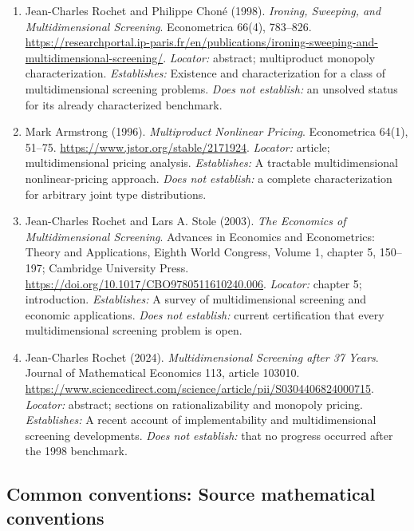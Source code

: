 \documentclass[11pt,a4paper]{article}
\begin{document}
\begin{enumerate}

\item[S1] Jean-Charles Rochet and Philippe Choné (1998). \emph{Ironing, Sweeping, and Multidimensional Screening}. Econometrica 66(4), 783--826. \url{https://researchportal.ip-paris.fr/en/publications/ironing-sweeping-and-multidimensional-screening/}. \textit{Locator:} abstract; multiproduct monopoly characterization. \textit{Establishes:} Existence and characterization for a class of multidimensional screening problems. \textit{Does not establish:} an unsolved status for its already characterized benchmark.

\item[S2] Mark Armstrong (1996). \emph{Multiproduct Nonlinear Pricing}. Econometrica 64(1), 51--75. \url{https://www.jstor.org/stable/2171924}. \textit{Locator:} article; multidimensional pricing analysis. \textit{Establishes:} A tractable multidimensional nonlinear-pricing approach. \textit{Does not establish:} a complete characterization for arbitrary joint type distributions.

\item[S3] Jean-Charles Rochet and Lars A. Stole (2003). \emph{The Economics of Multidimensional Screening}. Advances in Economics and Econometrics: Theory and Applications, Eighth World Congress, Volume 1, chapter 5, 150--197; Cambridge University Press. \url{https://doi.org/10.1017/CBO9780511610240.006}. \textit{Locator:} chapter 5; introduction. \textit{Establishes:} A survey of multidimensional screening and economic applications. \textit{Does not establish:} current certification that every multidimensional screening problem is open.

\item[S4] Jean-Charles Rochet (2024). \emph{Multidimensional Screening after 37 Years}. Journal of Mathematical Economics 113, article 103010. \url{https://www.sciencedirect.com/science/article/pii/S0304406824000715}. \textit{Locator:} abstract; sections on rationalizability and monopoly pricing. \textit{Establishes:} A recent account of implementability and multidimensional screening developments. \textit{Does not establish:} that no progress occurred after the 1998 benchmark.

\end{enumerate}

\subsection*{Common conventions: Source mathematical conventions}
\end{document}
